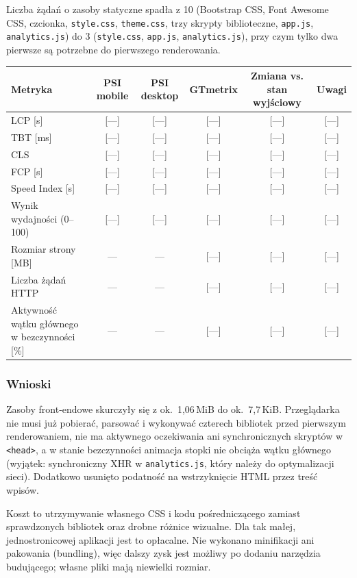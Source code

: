Liczba żądań o zasoby statyczne spadła z 10 (Bootstrap CSS, Font Awesome CSS, czcionka,
\texttt{style.css}, \texttt{theme.css}, trzy skrypty biblioteczne, \texttt{app.js},
\texttt{analytics.js}) do 3 (\texttt{style.css}, \texttt{app.js}, \texttt{analytics.js}),
przy czym tylko dwa pierwsze są potrzebne do pierwszego renderowania.

\begin{tablehere}
\centering
\begin{tabular}{l c c c c c}
\toprule
\textbf{Metryka} & \textbf{PSI mobile} & \textbf{PSI desktop} & \textbf{GTmetrix} & \textbf{Zmiana vs. stan wyjściowy} & \textbf{Uwagi} \\
\midrule
LCP [s]        & [—] & [—] & [—] & [—] & [—] \\
TBT [ms]       & [—] & [—] & [—] & [—] & [—] \\
CLS            & [—] & [—] & [—] & [—] & [—] \\
FCP [s]        & [—] & [—] & [—] & [—] & [—] \\
Speed Index [s]& [—] & [—] & [—] & [—] & [—] \\
\midrule
Wynik wydajności (0–100) & [—] & [—] & [—] & [—] & [—] \\
Rozmiar strony [MB]      & —   & —   & [—] & [—] & [—] \\
Liczba żądań HTTP        & —   & —   & [—] & [—] & [—] \\
Aktywność wątku głównego w bezczynności [\%] & — & — & [—] & [—] & [—] \\
\bottomrule
\end{tabular}
\caption{Wyniki pomiarów dla optymalizacji front-endu}
\end{tablehere}

\subsubsection{Wnioski}

Zasoby front-endowe skurczyły się z ok.\ 1,06\,MiB do ok.\ 7,7\,KiB. Przeglądarka nie
musi już pobierać, parsować i wykonywać czterech bibliotek przed pierwszym renderowaniem,
nie ma aktywnego oczekiwania ani synchronicznych skryptów w \texttt{<head>}, a w stanie
bezczynności animacja stopki nie obciąża wątku głównego (wyjątek: synchroniczny XHR w
\texttt{analytics.js}, który należy do optymalizacji sieci). Dodatkowo usunięto
podatność na wstrzyknięcie HTML przez treść wpisów.

Koszt to utrzymywanie własnego CSS i kodu pośredniczącego zamiast sprawdzonych bibliotek
oraz drobne różnice wizualne. Dla tak małej, jednostronicowej aplikacji jest to
opłacalne. Nie wykonano minifikacji ani pakowania (bundling), więc dalszy zysk jest możliwy
po dodaniu narzędzia budującego; własne pliki mają niewielki rozmiar.
